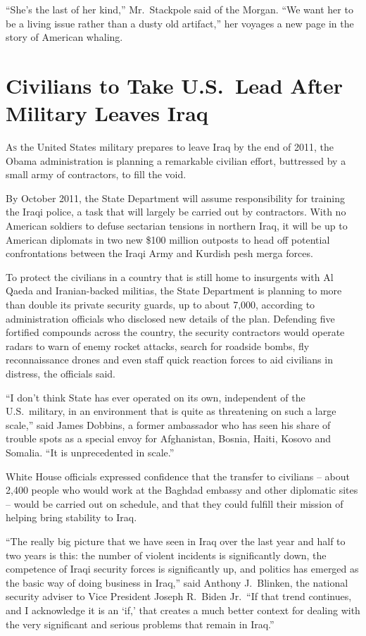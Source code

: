 ﻿\documentclass[12pt]{article}
\begin{document}
``She's the last of her kind,'' Mr.~Stackpole said of the Morgan. ``We want her to be a living issue
rather than a dusty old artifact,'' her voyages a new page in the story of American whaling.

\section{Civilians to Take U.S.~Lead After Military Leaves Iraq}

\lettrine{A}{s} the United States military prepares to leave Iraq by the end
of 2011, the Obama administration is planning a remarkable civilian effort, buttressed by a small
army of contractors, to fill the void.

By October 2011, the State Department will assume responsibility for training the Iraqi police, a
task that will largely be carried out by contractors. With no American soldiers to defuse sectarian
tensions in northern Iraq, it will be up to American diplomats in two new \$100 million outposts to
head off potential confrontations between the Iraqi Army and Kurdish pesh merga forces.

To protect the civilians in a country that is still home to insurgents with Al Qaeda and
Iranian-backed militias, the State Department is planning to more than double its private security
guards, up to about 7,000, according to administration officials who disclosed new details of the
plan. Defending five fortified compounds across the country, the security contractors would operate
radars to warn of enemy rocket attacks, search for roadside bombs, fly reconnaissance drones and
even staff quick reaction forces to aid civilians in distress, the officials said.

``I don't think State has ever operated on its own, independent of the U.S.~military, in an
environment that is quite as threatening on such a large scale,'' said James Dobbins, a former
ambassador who has seen his share of trouble spots as a special envoy for Afghanistan, Bosnia,
Haiti, Kosovo and Somalia. ``It is unprecedented in scale.''

White House officials expressed confidence that the transfer to civilians -- about 2,400 people who
would work at the Baghdad embassy and other diplomatic sites -- would be carried out on schedule,
and that they could fulfill their mission of helping bring stability to Iraq.

``The really big picture that we have seen in Iraq over the last year and half to two years is this:
the number of violent incidents is significantly down, the competence of Iraqi security forces is
significantly up, and politics has emerged as the basic way of doing business in Iraq,'' said
Anthony J.~Blinken, the national security adviser to Vice President Joseph R.~Biden Jr.~``If that
trend continues, and I acknowledge it is an `if,' that creates a much better context for dealing
with the very significant and serious problems that remain in Iraq.''
\end{document}
